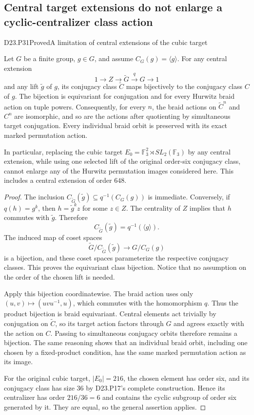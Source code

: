 \subsection{Central target extensions do not enlarge a cyclic-centralizer class action}

\begin{statement}{D23.P31}{Proved}{A limitation of central extensions of the cubic target}
\end{statement}
Let $G$ be a finite group, $g\in G$, and assume
$C_G(g)=\langle g\rangle$. For any central extension
\[
              1\longrightarrow Z\longrightarrow
              \widetilde G\xrightarrow{q}G\longrightarrow1
\]
and any lift $\widetilde g$ of $g$, its conjugacy class
$\widetilde C$ maps bijectively to the conjugacy class
$C$ of $g$. The bijection is equivariant for conjugation
and for every Hurwitz braid action on tuple powers.
Consequently, for every $n$, the braid actions on
$\widetilde C^n$ and $C^n$ are isomorphic, and so are
the actions after quotienting by simultaneous target
conjugation. Every individual braid orbit is preserved
with its exact marked permutation action.

In particular, replacing the cubic target
$E_0=\mathbb F_3^2\rtimes SL_2(\mathbb F_3)$ by any
central extension, while using one selected lift of
the original order-six conjugacy class, cannot enlarge
any of the Hurwitz permutation images considered here.
This includes a central extension of order $648$.

\begin{proof}
The inclusion
$C_{\widetilde G}(\widetilde g)\subseteq
q^{-1}(C_G(g))$ is immediate. Conversely, if
$q(h)=g^k$, then $h=\widetilde g^kz$ for some
$z\in Z$. The centrality of $Z$ implies that $h$
commutes with $\widetilde g$. Therefore
\[
 C_{\widetilde G}(\widetilde g)
                  =q^{-1}(\langle g\rangle).
\]
The induced map of coset spaces
\[
 \widetilde G/C_{\widetilde G}(\widetilde g)
                    \longrightarrow G/C_G(g)
\]
is a bijection, and these coset spaces parameterize
the respective conjugacy classes. This proves the
equivariant class bijection. Notice that no assumption
on the order of the chosen lift is needed.

Apply this bijection coordinatewise. The braid action
uses only $(u,v)\mapsto(uvu^{-1},u)$, which commutes
with the homomorphism $q$. Thus the product bijection
is braid equivariant. Central elements act trivially
by conjugation on $\widetilde C$, so its target action
factors through $G$ and agrees exactly with the action
on $C$. Passing to simultaneous conjugacy orbits
therefore remains a bijection. The same reasoning
shows that an individual braid orbit, including one
chosen by a fixed-product condition, has the same
marked permutation action as its image.

For the original cubic target, $|E_0|=216$, the chosen
element has order six, and its conjugacy class has
size $36$ by D23.P17's complete construction. Hence
its centralizer has order $216/36=6$ and contains
the cyclic subgroup of order six generated by it.
They are equal, so the general assertion applies.
\end{proof}

